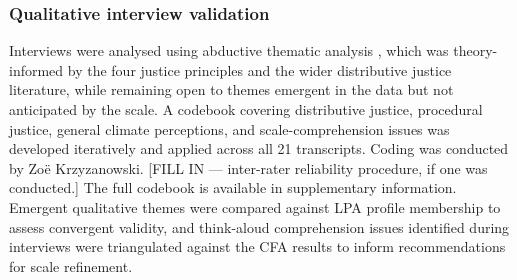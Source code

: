 \documentclass[10pt,letterpaper]{article}
\begin{document}
\subsubsection*{Qualitative interview validation}
Interviews were analysed using abductive thematic analysis \autocite{thompson2022,tavory2014}, which was theory-informed by the four justice principles and the wider distributive justice literature, while remaining open to themes emergent in the data but not anticipated by the scale.
A codebook covering distributive justice, procedural justice, general climate perceptions, and scale-comprehension issues was developed iteratively and applied across all 21 transcripts.
Coding was conducted by Zoë Krzyzanowski.
[FILL IN — inter-rater reliability procedure, if one was conducted.]
The full codebook is available in supplementary information.
Emergent qualitative themes were compared against LPA profile membership to assess convergent validity, and think-aloud comprehension issues identified during interviews were triangulated against the CFA results to inform recommendations for scale refinement.

\end{document}
